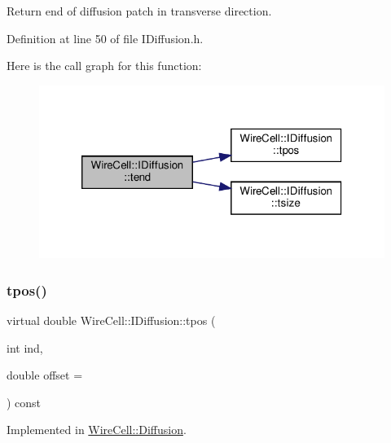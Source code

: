 Return end of diffusion patch in transverse direction. 



Definition at line 50 of file I\+Diffusion.\+h.

Here is the call graph for this function\+:
\nopagebreak
\begin{figure}[H]
\begin{center}
\leavevmode
\includegraphics[width=320pt]{class_wire_cell_1_1_i_diffusion_ab14ac45f6a21301ba83eebd9d5eabff2_cgraph}
\end{center}
\end{figure}
\mbox{\label{class_wire_cell_1_1_i_diffusion_a0f9fd1a277828333fa08f77fd9a6315d}} 
\subsubsection{\texorpdfstring{tpos()}{tpos()}}
{\footnotesize\ttfamily virtual double Wire\+Cell\+::\+I\+Diffusion\+::tpos (\begin{DoxyParamCaption}\item[{int}]{ind,  }\item[{double}]{offset = {} }\end{DoxyParamCaption}) const\hspace{0.3cm}{\ttfamily [pure virtual]}}



Implemented in \hyperlink{class_wire_cell_1_1_diffusion_a86e78fa0c302bbbd2e1329b3f0294454}{Wire\+Cell\+::\+Diffusion}.

